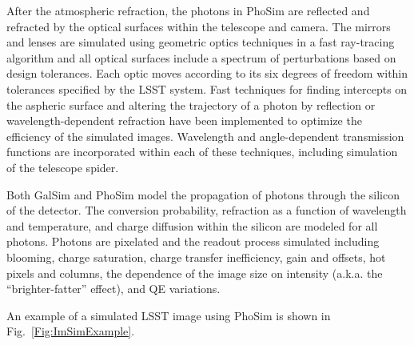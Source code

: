 After the atmospheric refraction, the photons in PhoSim are reflected
and refracted by the optical surfaces within the telescope and
camera. The mirrors and lenses are simulated using geometric optics
techniques in a fast ray-tracing algorithm and all optical surfaces
include a spectrum of perturbations based on design tolerances. Each
optic moves according to its six degrees of freedom within tolerances
specified by the LSST system. Fast techniques for finding intercepts
on the aspheric surface and altering the trajectory of a photon by
reflection or wavelength-dependent refraction have been implemented to
optimize the efficiency of the simulated images. Wavelength and
angle-dependent transmission functions are incorporated within each of
these techniques, including simulation of the telescope spider.

Both GalSim and PhoSim model the propagation of photons through the
silicon of the detector. The conversion probability, refraction as a
function of wavelength and temperature, and charge diffusion within
the silicon are modeled for all photons. Photons are pixelated and the
readout process simulated including blooming, charge saturation,
charge transfer inefficiency, gain and offsets, hot pixels and
columns, the dependence of the image size on intensity (a.k.a. the
``brighter-fatter'' effect), and QE variations.

An example of a simulated LSST image using PhoSim is shown in
Fig.~\ref{Fig:ImSimExample}.
